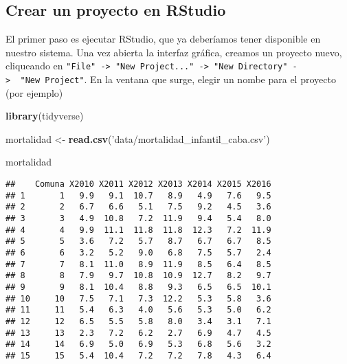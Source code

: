 \documentclass[]{book}
\newenvironment{Shaded}{\begin{snugshade}}{\end{snugshade}}
\newcommand{\KeywordTok}[1]{\textcolor[rgb]{0.13,0.29,0.53}{\textbf{#1}}}
\newcommand{\StringTok}[1]{\textcolor[rgb]{0.31,0.60,0.02}{#1}}
\newcommand{\OperatorTok}[1]{\textcolor[rgb]{0.81,0.36,0.00}{\textbf{#1}}}
\newcommand{\NormalTok}[1]{#1}
\theoremstyle{definition}
\theoremstyle{definition}
\theoremstyle{definition}
\theoremstyle{remark}
\begin{document}
\subsection{Crear un proyecto en
RStudio}\label{crear-un-proyecto-en-rstudio}

El primer paso es ejecutar RStudio, que ya deberíamos tener disponible
en nuestro sistema. Una vez abierta la interfaz gráfica, creamos un
proyecto nuevo, cliqueando en
\texttt{"File"\ -\textgreater{}\ "New\ Project..."\ -\textgreater{}\ "New\ Directory"\ -\textgreater{}\ \ "New\ Project"}.
En la ventana que surge, elegir un nombe para el proyecto (por ejemplo)

\begin{Shaded}
\begin{Highlighting}[]
\KeywordTok{library}\NormalTok{(tidyverse)}
\end{Highlighting}
\end{Shaded}

\begin{Shaded}
\begin{Highlighting}[]
\NormalTok{mortalidad <-}\StringTok{ }\KeywordTok{read.csv}\NormalTok{(}\StringTok{'data/mortalidad_infantil_caba.csv'}\NormalTok{)}

\NormalTok{mortalidad}
\end{Highlighting}
\end{Shaded}

\begin{verbatim}
##    Comuna X2010 X2011 X2012 X2013 X2014 X2015 X2016
## 1       1   9.9   9.1  10.7   8.9   4.9   7.6   9.5
## 2       2   6.7   6.6   5.1   7.5   9.2   4.5   3.6
## 3       3   4.9  10.8   7.2  11.9   9.4   5.4   8.0
## 4       4   9.9  11.1  11.8  11.8  12.3   7.2  11.9
## 5       5   3.6   7.2   5.7   8.7   6.7   6.7   8.5
## 6       6   3.2   5.2   9.0   6.8   7.5   5.7   2.4
## 7       7   8.1  11.0   8.9  11.9   8.5   6.4   8.5
## 8       8   7.9   9.7  10.8  10.9  12.7   8.2   9.7
## 9       9   8.1  10.4   8.8   9.3   6.5   6.5  10.1
## 10     10   7.5   7.1   7.3  12.2   5.3   5.8   3.6
## 11     11   5.4   6.3   4.0   5.6   5.3   5.0   6.2
## 12     12   6.5   5.5   5.8   8.0   3.4   3.1   7.1
## 13     13   2.3   7.2   6.2   2.7   6.9   4.7   4.5
## 14     14   6.9   5.0   6.9   5.3   6.8   5.6   3.2
## 15     15   5.4  10.4   7.2   7.2   7.8   4.3   6.4
\end{verbatim}

\begin{Shaded}
\end{Shaded}
\end{document}
